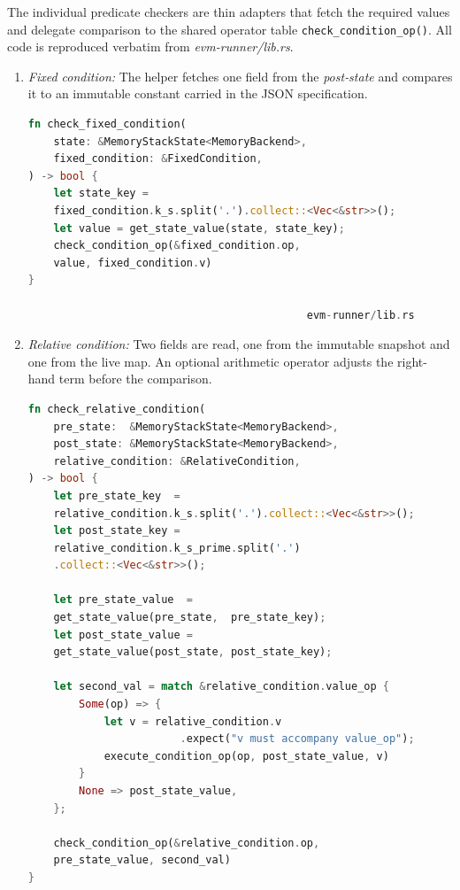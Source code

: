 The individual predicate checkers are thin adapters that fetch the required
values and delegate comparison to the shared operator table \texttt{check\_con\allowbreak dition\_op()}.  
All code is reproduced verbatim from \textit{evm-runner/lib.rs}.

\begin{enumerate}
\item \textit{Fixed condition:}  
      The helper fetches one field from the \textit{post‐state} and compares it
      to an immutable constant carried in the JSON specification.
\begin{lstlisting}[caption={[check\_fixed\_condition]},label={lst:fixed},language=Rust]
fn check_fixed_condition(
    state: &MemoryStackState<MemoryBackend>,
    fixed_condition: &FixedCondition,
) -> bool {
    let state_key = 
    fixed_condition.k_s.split('.').collect::<Vec<&str>>();
    let value = get_state_value(state, state_key);
    check_condition_op(&fixed_condition.op, 
    value, fixed_condition.v)
}

                                            evm-runner/lib.rs
\end{lstlisting}

\item \textit{Relative condition:}  
      Two fields are read, one from the immutable snapshot and one from the live map.  An optional arithmetic operator adjusts the right-hand term before the comparison.
\begin{lstlisting}[caption={[check\_relative\_condition]},label={lst:relative},language=Rust]
fn check_relative_condition(
    pre_state:  &MemoryStackState<MemoryBackend>,
    post_state: &MemoryStackState<MemoryBackend>,
    relative_condition: &RelativeCondition,
) -> bool {
    let pre_state_key  = 
    relative_condition.k_s.split('.').collect::<Vec<&str>>();
    let post_state_key = 
    relative_condition.k_s_prime.split('.')
    .collect::<Vec<&str>>();

    let pre_state_value  = 
    get_state_value(pre_state,  pre_state_key);
    let post_state_value = 
    get_state_value(post_state, post_state_key);

    let second_val = match &relative_condition.value_op {
        Some(op) => {
            let v = relative_condition.v
                        .expect("v must accompany value_op");
            execute_condition_op(op, post_state_value, v)
        }
        None => post_state_value,
    };

    check_condition_op(&relative_condition.op, 
    pre_state_value, second_val)
}


\end{lstlisting}
\end{enumerate}
